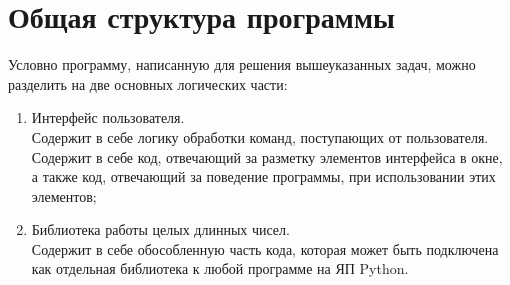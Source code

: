 \clearpage
\section{Общая структура программы}
Условно программу, написанную для решения вышеуказанных задач, можно разделить на две основных логических части:
\begin{enumerate}
    \item Интерфейс пользователя.\\
    Содержит в себе логику обработки команд, поступающих от пользователя. Содержит в себе код,
    отвечающий за разметку элементов интерфейса в окне, а также код, отвечающий за поведение программы, при использовании этих элементов;
    \item Библиотека работы целых длинных чисел.\\
    Содержит в себе обособленную часть кода, которая может быть подключена как отдельная библиотека к любой программе на ЯП Python.
\end{enumerate}


\clearpage
